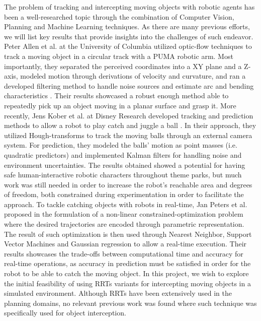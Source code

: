 \documentclass[letterpaper, 10 pt, conference]{ieeeconf}  %
\begin{document}
The problem of tracking and intercepting moving objects with robotic agents has
been a well-researched topic through the combination of Computer Vision,
Planning and Machine Learning techniques. As there are many previous efforts,
we will list key results that provide insights into the challenges of such
endeavor. Peter Allen et al. at the University of Columbia utilized optic-flow
techniques to track a moving object in a circular track with a PUMA robotic
arm. Most importantly, they separated the perceived coordinates into a XY plane
and a Z-axis, modeled motion through derivations of velocity and curvature, and
ran a developed filtering method to handle noise sources and estimate arc and
bending characteristics \cite{Allen91automatedtracking}. Their results
showcased a robust enough method able to repeatedly pick up an object moving in
a planar surface and grasp it.  More recently, Jens Kober et al. at Disney
Research developed tracking and prediction methods to allow a robot to play
catch and juggle a ball \cite{koberplaying}. In their approach, they utilized
Hough-transforms to track the moving balls through an external camera system.
For prediction, they modeled the balls’ motion as point masses (i.e. quadratic
predictors) and implemented Kalman filters for handling noise and environment
uncertainties. The results obtained showed a potential for having safe
human-interactive robotic characters throughout theme parks, but much work was
still needed in order to increase the robot’s reachable area and degrees of
freedom, both constrained during experimentation in order to facilitate the
approach. To tackle catching objects with robots in real-time, Jan Peters et
al. proposed in \cite{lampariello2011trajectory} the formulation of a
non-linear constrained-optimization problem where the desired trajectories are
encoded through parametric representation. The result of such optimization is
then used through Nearest Neighbor, Support Vector Machines and Gaussian
regression to allow a real-time execution. Their results showcases the
trade-offs between computational time and accuracy for real-time operations, as
accuracy in prediction must be satisfied in order for the robot to be able to
catch the moving object. In this project, we wish to explore the initial
feasibility of using RRTs variants for intercepting moving objects in a
simulated environment. Although RRTs have been extensively used in the planning
domains, no relevant previous work was found where such technique was
specifically used for object interception.
\end{document}
